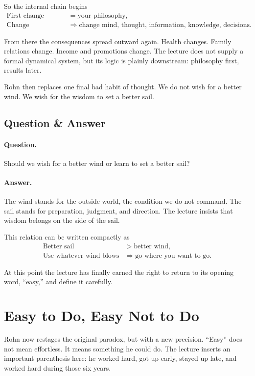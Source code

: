 So the internal chain begins
\begin{align}
\text{First change} &= \text{your philosophy},\\
\text{Change philosophy}
&\Longrightarrow
\text{change mind, thought, information, knowledge, decisions}.
\end{align}

From there the consequences spread outward again. Health changes. Family relations change. Income and promotions change. The lecture does not supply a formal dynamical system, but its logic is plainly downstream: philosophy first, results later.

Rohn then replaces one final bad habit of thought. We do not wish for a better wind. We wish for the wisdom to set a better sail.

\subsection{Question \& Answer}

\paragraph{Question.} Should we wish for a better wind or learn to set a better sail?

\paragraph{Answer.} The wind stands for the outside world, the condition we do not command. The sail stands for preparation, judgment, and direction. The lecture insists that wisdom belongs on the side of the sail.

This relation can be written compactly as
\begin{align}
\text{Better sail} &> \text{better wind},\\
\text{Use whatever wind blows} &\Longrightarrow \text{go where you want to go}.
\end{align}

At this point the lecture has finally earned the right to return to its opening word, ``easy,'' and define it carefully.

\section{Easy to Do, Easy Not to Do}

Rohn now restages the original paradox, but with a new precision. ``Easy'' does not mean effortless. It means something he could do. The lecture inserts an important parenthesis here: he worked hard, got up early, stayed up late, and worked hard during those six years.

